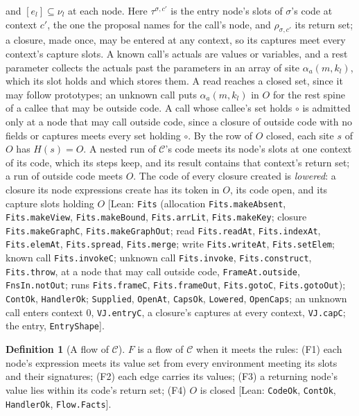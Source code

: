 \documentclass[10pt,a4paper]{article}
\theoremstyle{definition}
\newtheorem{definition}[theorem]{Definition}
\theoremstyle{remark}
\newcommand{\lean}[1]{\texttt{\small #1}}
\newcommand{\status}[1]{\textsf{\small[#1]}}
\newcommand{\cC}{\mathcal{C}}
\begin{document}
and $[e_l]\subseteq\nu_l$ at each node. Here $\tau^{\sigma,c'}$ is the
entry node's slots of $\sigma$'s code at context $c'$, the one the
proposal names for the call's node, and $\rho_{\sigma,c'}$ its return
set; a closure, made once, may be entered at any context, so its captures
meet every context's capture slots. A known call's actuals are values or variables, and a rest parameter collects the
actuals past the parameters in an array of site $\alpha_a(m,k_l)$, which
its slot holds and which stores them. A read reaches a closed set, since it
may follow prototypes; an unknown call puts $\alpha_a(m,k_l)$ in $O$ for
the rest spine of a callee that may be outside code. A call whose callee's
set holds $\circ$ is admitted only at a node that may call outside code,
since a closure of outside code with no fields or captures meets every set
holding $\circ$. By the row of $O$ closed, each site $s$ of $O$ has
$H(s)=O$. A nested run of $\cC$'s
code meets its node's slots at one context of its code, which its steps
keep, and its result contains that context's return set; a run of outside code meets $O$. The code of every closure created
is \emph{lowered}: a closure its node expressions create has its token in
$O$, its code open, and its capture slots holding $O$
\status{Lean: \lean{Fits} (allocation \lean{Fits.makeAbsent}, \lean{Fits.makeView}, \lean{Fits.makeBound}, \lean{Fits.arrLit}, \lean{Fits.makeKey}; closure \lean{Fits.makeGraphC}, \lean{Fits.makeGraphOut}; read \lean{Fits.readAt}, \lean{Fits.indexAt}, \lean{Fits.elemAt}, \lean{Fits.spread}, \lean{Fits.merge}; write \lean{Fits.writeAt}, \lean{Fits.setElem}; known call \lean{Fits.invokeC}; unknown call \lean{Fits.invoke}, \lean{Fits.construct}, \lean{Fits.throw}, at a node that may call outside code, \lean{FrameAt.outside}, \lean{FnsIn.notOut}; runs \lean{Fits.frameC}, \lean{Fits.frameOut}, \lean{Fits.gotoC}, \lean{Fits.gotoOut}); \lean{ContOk}, \lean{HandlerOk}; \lean{Supplied}, \lean{OpenAt}, \lean{CapsOk}, \lean{Lowered}, \lean{OpenCaps}; an unknown call enters context $0$, \lean{VJ.entryC}, a closure's captures at every context, \lean{VJ.capC}; the entry, \lean{EntryShape}}.

\begin{definition}[A flow of $\cC$]\label{def:flow}
$F$ is a flow of $\cC$ when it meets the rules: (F1) each node's
expression meets its value set from every environment meeting its slots
and their signatures; (F2) each edge carries its values; (F3) a returning
node's value lies within its code's return set; (F4) $O$ is closed
\status{Lean: \lean{CodeOk}, \lean{ContOk}, \lean{HandlerOk}, \lean{Flow.Facts}}.
\end{definition}
\end{document}
